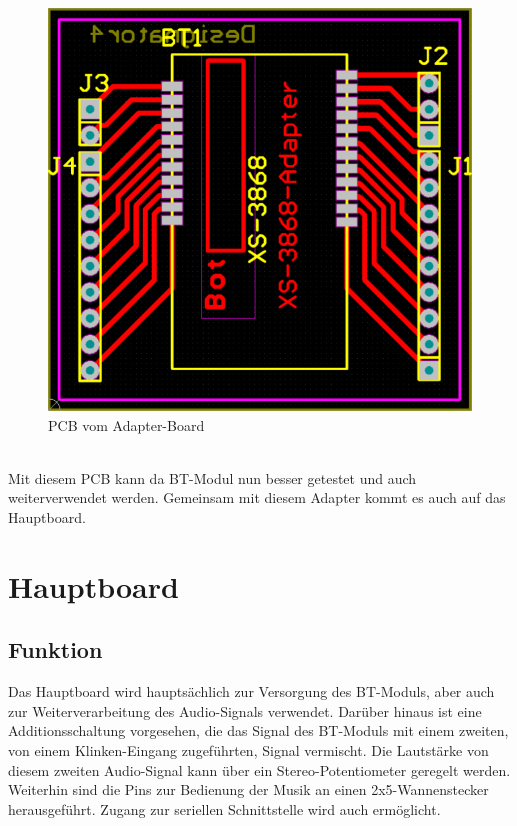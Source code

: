 \begin{figure} [h]
	\centering
	\caption{PCB vom Adapter-Board}
	\includegraphics[width=1\textwidth]{schaltungen/adapter_pcb.png}
\end{figure} \\
Mit diesem PCB kann da BT-Modul nun besser getestet und auch weiterverwendet werden. Gemeinsam mit diesem Adapter kommt es auch auf das Hauptboard.
\newpage

\section{Hauptboard}
\subsection{Funktion}
Das Hauptboard wird hauptsächlich zur Versorgung des BT-Moduls, aber auch zur Weiterverarbeitung des Audio-Signals verwendet. Darüber hinaus ist eine Additionsschaltung vorgesehen, die das Signal des BT-Moduls mit einem zweiten, von einem Klinken-Eingang zugeführten, Signal vermischt. Die Lautstärke von diesem zweiten Audio-Signal kann über ein Stereo-Potentiometer geregelt werden. \\
Weiterhin sind die Pins zur Bedienung der Musik an einen 2x5-Wannenstecker herausgeführt. Zugang zur seriellen Schnittstelle wird auch ermöglicht.
